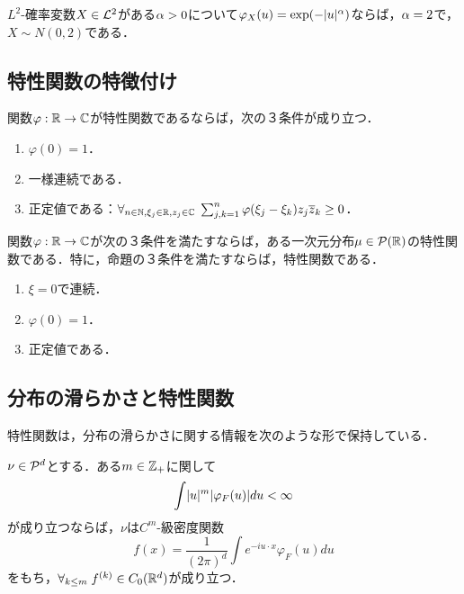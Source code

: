 \documentclass[uplatex,dvipdfmx]{jsreport}
\begin{document}
\begin{corollary}
    $L^2$-確率変数$X\in\L^2$がある$\al>0$について$\varphi_X(u)=\exp(-\abs{u}^\al)$ならば，$\al=2$で，$X\sim N(0,2)$である．
\end{corollary}

\subsection{特性関数の特徴付け}

\begin{proposition}
    関数$\varphi:\R\to\C$が特性関数であるならば，次の３条件が成り立つ．
    \begin{enumerate}
        \item $\varphi(0)=1$．
        \item 一様連続である．
        \item 正定値である：$\forall_{n\in\N,\xi_j\in\R,z_j\in\C}\;\sum^n_{j,k=1}\varphi(\xi_j-\xi_k)z_j\o{z}_k\ge0$．
    \end{enumerate}
\end{proposition}

\begin{theorem}[Bochner]\label{thm-Bochner}
    関数$\varphi:\R\to\C$が次の３条件を満たすならば，ある一次元分布$\mu\in\P(\R)$の特性関数である．特に，命題の３条件を満たすならば，特性関数である．
    \begin{enumerate}
        \item $\xi=0$で連続．
        \item $\varphi(0)=1$．
        \item 正定値である．
    \end{enumerate}
\end{theorem}

\subsection{分布の滑らかさと特性関数}

\begin{tcolorbox}[colframe=ForestGreen, colback=ForestGreen!10!white,breakable,colbacktitle=ForestGreen!40!white,coltitle=black,fonttitle=\bfseries\sffamily,
title=]
    特性関数は，分布の滑らかさに関する情報を次のような形で保持している．
\end{tcolorbox}

\begin{proposition}
    $\nu\in\P^d$とする．ある$m\in\Z_+$に関して
    \[\int\abs{u}^m\abs{\varphi_F(u)}du<\infty\]
    が成り立つならば，$\nu$は$C^m$-級密度関数
    \[f(x)=\frac{1}{(2\pi)^d}\int e^{-iu\cdot x}\varphi_F(u)du\]
    をもち，$\forall_{k\le m}\;f^{(k)}\in C_0(\R^d)$が成り立つ．
\end{proposition}
\end{document}
